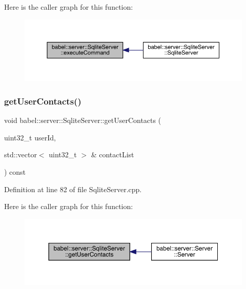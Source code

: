 Here is the caller graph for this function\+:\nopagebreak
\begin{figure}[H]
\begin{center}
\leavevmode
\includegraphics[width=350pt]{classbabel_1_1server_1_1_sqlite_server_abb0cc14be5f51826b9165e14ce83e0d0_icgraph}
\end{center}
\end{figure}
\mbox{\label{classbabel_1_1server_1_1_sqlite_server_ab00366d846c96ad4521cda421b8a0f31}} 
\subsubsection{\texorpdfstring{get\+User\+Contacts()}{getUserContacts()}}
{\footnotesize\ttfamily void babel\+::server\+::\+Sqlite\+Server\+::get\+User\+Contacts (\begin{DoxyParamCaption}\item[{uint32\+\_\+t}]{user\+Id,  }\item[{std\+::vector$<$ uint32\+\_\+t $>$ \&}]{contact\+List }\end{DoxyParamCaption}) const}



Definition at line 82 of file Sqlite\+Server.\+cpp.

Here is the caller graph for this function\+:\nopagebreak
\begin{figure}[H]
\begin{center}
\leavevmode
\includegraphics[width=350pt]{classbabel_1_1server_1_1_sqlite_server_ab00366d846c96ad4521cda421b8a0f31_icgraph}
\end{center}
\end{figure}
\mbox{\label{classbabel_1_1server_1_1_sqlite_server_ac0e58c4ae276fc3c52b7205a5098a75c}} 
